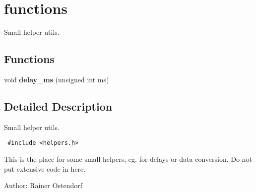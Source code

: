 \section{functions}
\label{group__Auxiliary}
Small helper utils.  
\subsection*{Functions}
\begin{CompactItemize}
\item 
void \textbf{delay\_\-ms} (unsigned int ms)\label{group__Auxiliary_gf29c4657f62375d42c6ee104b6bf4491}

\end{CompactItemize}


\subsection{Detailed Description}
Small helper utils. 



\begin{Code}\begin{verbatim} #include <helpers.h> 
\end{verbatim}\end{Code}



This is the place for some small helpers, eg. for delays or data-conversion. Do not put extensive code in here.

\begin{Desc}
\item[Author:]Rainer Ostendorf \end{Desc}
